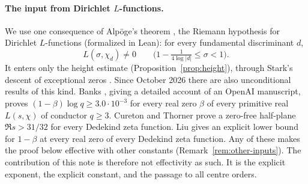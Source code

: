 \documentclass[11pt,a4paper]{article}
\theoremstyle{plain}
\theoremstyle{remark}
\begin{document}
\paragraph{The input from Dirichlet $L$-functions.}
We use one consequence of Alp\"oge's theorem \cite{Alpoge}, the Riemann hypothesis for Dirichlet $L$-functions
(formalized in Lean): for every fundamental discriminant $d$,
\[
 L(\sigma,\chi_d)\neq0\qquad\bigl(1-\tfrac1{4\log|d|}\leq\sigma<1\bigr).
 \tag{2.1}
\]
It enters only the height estimate (Proposition~\ref{prop:height}), through Stark's descent of exceptional zeros
\cite[Lemma~9]{Stark}. Since October 2026 there are also unconditional results of this kind. Banks \cite{Banks},
giving a detailed account of an OpenAI manuscript, proves $(1-\beta)\log q\geq3.0\cdot10^{-3}$ for every real zero
$\beta$ of every primitive real $L(s,\chi)$ of conductor $q\geq3$. Cureton and Thorner \cite{CT} prove a zero-free
half-plane $\Re s>31/32$ for every Dedekind zeta function. Liu \cite{Liu} gives an explicit lower bound for $1-\beta$
at every real zero of every Dedekind zeta function. Any of these makes the proof below effective with other
constants (Remark~\ref{rem:other-inputs}). The contribution of this note is therefore not effectivity as such. It is the explicit exponent, the explicit constant, and the
passage to all centre orders.
\end{document}
